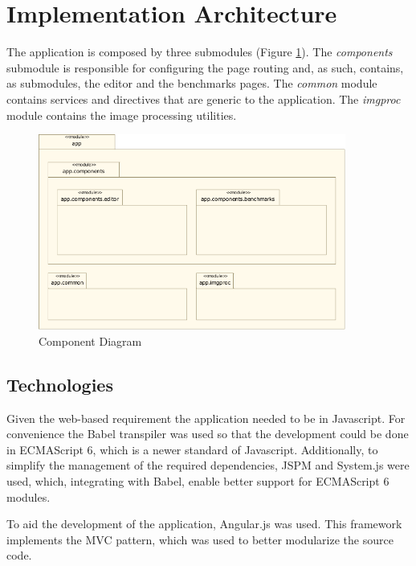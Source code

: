   \section {Implementation Architecture} %
    
    The application is composed by three submodules (Figure \ref{fig:component_diagram}). The \textit{components} submodule is responsible for configuring the page routing and, as such, contains, as submodules, the editor and the benchmarks pages. The \textit{common} module contains services and directives that are generic to the application. The \textit{imgproc} module contains the image processing utilities.
    
    \begin{figure}[H]
      \begin{center}
      	 \includegraphics[width=0.9\textwidth]{images/diagrams/component.pdf}
      \end{center}
      \caption{Component Diagram}
      \label{fig:component_diagram}
    \end{figure}


    \subsection {Technologies}    
      
      Given the web-based requirement the application needed to be in Javascript. For convenience the Babel transpiler was used so that the development could be done in ECMAScript 6, which is a newer standard of Javascript. Additionally, to simplify the management of the required dependencies, JSPM and System.js were used, which, integrating with Babel, enable better support for ECMAScript 6 modules. 
      
      To aid the development of the application, Angular.js was used. This framework implements the MVC pattern, which was used to better modularize the source code.
      
